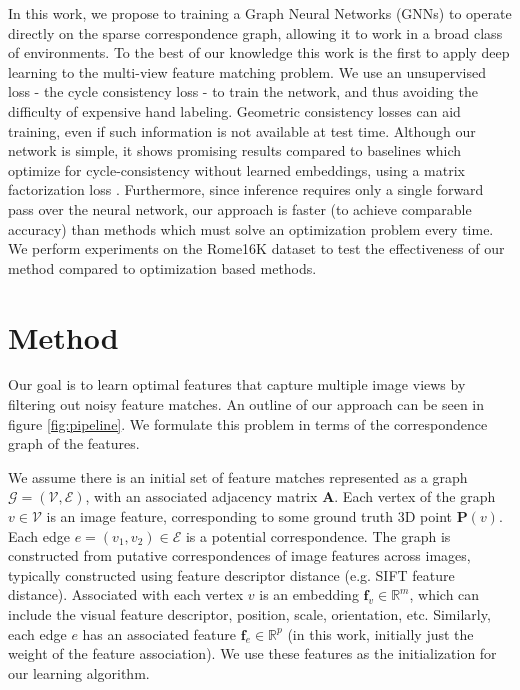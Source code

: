 \documentclass[10pt,twocolumn,letterpaper]{article}
\newcommand{\bR}{\mathbb{R}}
\newcommand{\mat}[1]{\mathbf{#1}}
\begin{document}
In this work, we propose to training a Graph Neural Networks (GNNs) to operate directly on the sparse correspondence graph, allowing it to work in a broad class of environments.
To the best of our knowledge this work is the first to apply deep learning to the multi-view feature matching problem.
We use an unsupervised loss - the cycle consistency loss - to train the network, and thus avoiding the difficulty of expensive hand labeling.
Geometric consistency losses can aid training, even if such information is not available at test time.
Although our network is simple, it shows promising results compared to baselines which optimize for cycle-consistency without learned embeddings, using a matrix factorization loss \cite{zhou2015multi, leonardos2016distributed}.
Furthermore, since inference requires only a single forward pass over the neural network, our approach is faster (to achieve comparable accuracy) than methods which must solve an optimization problem every time.
We perform experiments on the Rome16K \cite{li2010location} dataset to test the effectiveness of our method compared to optimization based methods.

\section{Method}
Our goal is to learn optimal features that capture multiple image views by filtering out noisy feature matches.
An outline of our approach can be seen in figure \ref{fig:pipeline}.
We formulate this problem in terms of the correspondence graph of the features.

We assume there is an initial set of feature matches represented as a graph $\mathcal{G} = (\mathcal{V}, \mathcal{E})$, with an associated adjacency matrix $\mat{A}$.
Each vertex of the graph $v \in \mathcal{V}$ is an image feature, corresponding to some ground truth 3D point $\mat{P}(v)$.
Each edge $e = (v_1, v_2) \in \mathcal{E}$ is a potential correspondence.
The graph is constructed from putative correspondences of image features across images, typically constructed using feature descriptor distance (e.g. SIFT feature distance).
Associated with each vertex $v$ is an embedding $\mat{f}_v \in \bR^m$, which can include the visual feature descriptor, position, scale, orientation, etc.
Similarly, each edge $e$ has an associated feature $\mat{f}_e \in \bR^p$ (in this work, initially just the weight of the feature association).
We use these features as the initialization for our learning algorithm.
\end{document}

